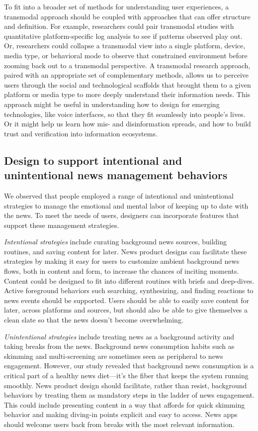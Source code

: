 \documentclass[sigchi]{acmart}
\begin{document}
To fit into a broader set of methods for understanding user experiences, a transmodal approach should be coupled with approaches that can offer structure and definition. For example, researchers could pair transmodal studies with quantitative platform-specific log analysis to see if patterns observed play out. Or, researchers could collapse a transmodal view into a single platform, device, media type, or behavioral mode to observe that constrained environment before zooming back out to a transmodal perspective. A transmodal research approach, paired with an appropriate set of complementary methods, allows us to perceive users through the social and technological scaffolds that brought them to a given platform or media type to more deeply understand their information needs. This approach might be useful in understanding how to design for emerging technologies, like voice interfaces, so that they fit seamlessly into people's lives. Or it might help us learn how mis- and disinformation spreads, and how to build trust and verification into information ecosystems.

\subsection{Design to support intentional and unintentional news management behaviors}
We observed that people employed a range of intentional and unintentional strategies to manage the emotional and mental labor of keeping up to date with the news. To meet the needs of users, designers can incorporate features that support these management strategies.

\textit{Intentional strategies} include curating background news sources, building routines, and saving content for later. News product designs can facilitate these strategies by making it easy for users to customize ambient background news flows, both in content and form, to increase the chances of inciting moments. Content could be designed to fit into different routines with briefs and deep-dives. Active foreground behaviors such searching, synthesizing, and finding reactions to news events should be supported. Users should be able to easily save content for later, across platforms and sources, but should also be able to give themselves a clean slate so that the news doesn't become overwhelming.

\textit{Unintentional strategies} include treating news as a background activity and taking breaks from the news. Background news consumption habits such as skimming and multi-screening are sometimes seen as peripheral to news engagement. However, our study revealed that background news consumption is a critical part of a healthy news diet—it's the fiber that keeps the system running smoothly. News product design should facilitate, rather than resist, background behaviors by treating them as mandatory steps in the ladder of news engagement. This could include presenting content in a way that affords for quick skimming behavior and making diving-in points explicit and easy to access. News apps should welcome users back from breaks with the most relevant information.
\end{document}
